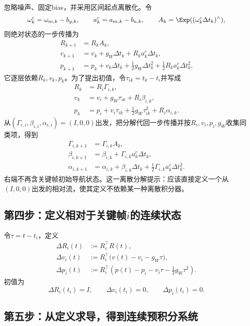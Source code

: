 忽略噪声、固定bias，并采用区间起点离散化。令
\[
    \omega_k^c=\omega_{m,k}-b_{g,k},
    \qquad
    a_k^c=a_{m,k}-b_{a,k},
    \qquad
    A_k=\Exp((\omega_k^c\Delta t_k)^\wedge),
\]
则绝对状态的一步传播为
\[
\begin{aligned}
    R_{k+1}&=R_kA_k,\\
    v_{k+1}&=v_k+g_W\Delta t_k+R_ka_k^c\Delta t_k,\\
    p_{k+1}&=p_k+v_k\Delta t_k
      +\frac12g_W\Delta t_k^2
      +\frac12R_ka_k^c\Delta t_k^2.
\end{aligned}
\]
它逐层依赖$R_k,v_k,p_k$。为了提出初值，令$\tau_{ik}=t_k-t_i$并写成
\[
\begin{aligned}
    R_k&=R_i\Gamma_{i,k},\\
    v_k&=v_i+g_W\tau_{ik}+R_i\beta_{i,k},\\
    p_k&=p_i+v_i\tau_{ik}
      +\frac12g_W\tau_{ik}^2+R_i\alpha_{i,k}.
\end{aligned}
\]
从$(\Gamma_{i,i},\beta_{i,i},\alpha_{i,i})=(I,0,0)$出发，把分解代回一步传播并按$R_i,v_i,p_i,g_W$收集同类项，得到
\[
\boxed{
\begin{aligned}
    \Gamma_{i,k+1}
    &=\Gamma_{i,k}A_k,\\
    \beta_{i,k+1}
    &=\beta_{i,k}+\Gamma_{i,k}a_k^c\Delta t_k,\\
    \alpha_{i,k+1}
    &=\alpha_{i,k}+\beta_{i,k}\Delta t_k
      +\frac12\Gamma_{i,k}a_k^c\Delta t_k^2.
\end{aligned}
}
\]
右端不再含关键帧初始导航状态。这一离散分解提示：应该直接定义一个从$(I,0,0)$出发的相对流，使其定义不依赖某一种离散积分器。

\subsection*{第四步：定义相对于关键帧$i$的连续状态}

令$\tau=t-t_i$，定义
\[
\boxed{
\begin{aligned}
    \Delta R_i(t)
    &:=R_i^\top R(t),\\
    \Delta v_i(t)
    &:=R_i^\top\bigl(v(t)-v_i-g_W\tau\bigr),\\
    \Delta p_i(t)
    &:=R_i^\top
      \left(
        p(t)-p_i-v_i\tau-\frac12g_W\tau^2
      \right).
\end{aligned}
}
\]
初值为
\[
    \Delta R_i(t_i)=I,
    \qquad
    \Delta v_i(t_i)=0,
    \qquad
    \Delta p_i(t_i)=0.
\]

\subsection*{第五步：从定义求导，得到连续预积分系统}

